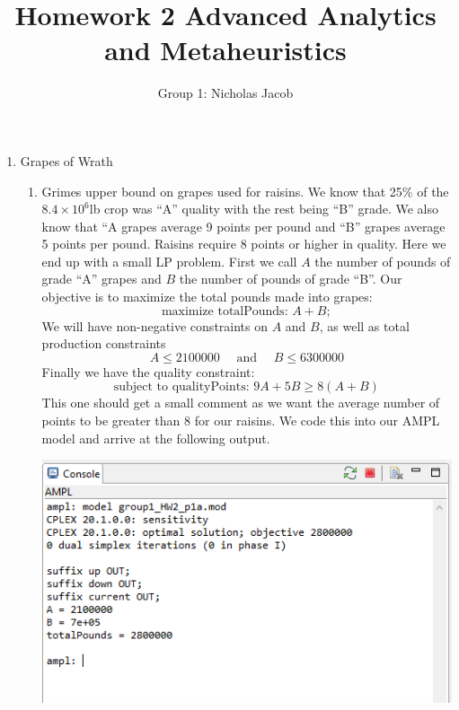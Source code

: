 \documentclass[11pt]{article}
\author{Group 1:  Nicholas Jacob}
\title{Homework 2 Advanced Analytics and Metaheuristics}
\begin{document}
\maketitle
%
\begin{enumerate}
\item Grapes of Wrath
\begin{enumerate}
\item Grimes upper bound on grapes used for raisins.  We know that 25\% of the $8.4\times10^6$lb crop was ``A'' quality with the rest being ``B'' grade.  We also know that ``A grapes average 9 points per pound and ``B'' grapes average 5 points per pound.  Raisins require 8 points or higher in quality.  Here we end up with a small LP problem.  First we call $A$ the number of pounds of grade ``A'' grapes and $B$ the number of pounds of grade ``B''.  Our objective is to maximize the total pounds made into grapes:
\[
\text{maximize totalPounds: }A +B;
\]
We will have non-negative constraints on $A$ and $B$, as well as total production constraints
\[
A\leq 2 100 000\quad\text{ and }\quad B\leq 6 300 000
\]
Finally we have the quality constraint:
\[
\text{subject to qualityPoints: }9A +5B \geq 8\left(A+B\right)
\]
This one should get a small comment as we want the average number of points to be greater than 8 for our raisins.  We code this into our AMPL model and arrive at the following output.


\includegraphics[width = .9\textwidth]{outputp1a.png}


\end{enumerate}
\end{enumerate}
\end{document}
